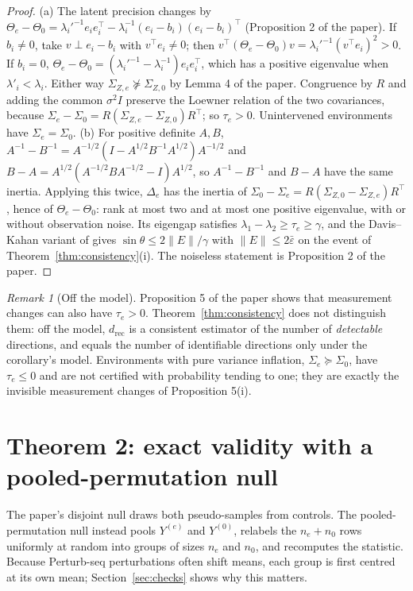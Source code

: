 \documentclass[11pt]{article}
\theoremstyle{remark}
\newtheorem{remark}{Remark}
\begin{document}
\begin{proof}
(a) The latent precision changes by $\Theta_e-\Theta_0=\lambda_i'^{-1}e_ie_i^\top-\lambda_i^{-1}(e_i-b_i)(e_i-b_i)^\top$ (Proposition 2 of the paper). If $b_i\ne0$, take $v\perp e_i-b_i$ with $v^\top e_i\ne0$; then $v^\top(\Theta_e-\Theta_0)v=\lambda_i'^{-1}(v^\top e_i)^2>0$. If $b_i=0$, $\Theta_e-\Theta_0=(\lambda_i'^{-1}-\lambda_i^{-1})e_ie_i^\top$, which has a positive eigenvalue when $\lambda'_i<\lambda_i$. Either way $\Sigma_{Z,e}\not\succeq\Sigma_{Z,0}$ by Lemma 4 of the paper. Congruence by $R$ and adding the common $\sigma^2I$ preserve the Loewner relation of the two covariances, because $\Sigma_e-\Sigma_0=R(\Sigma_{Z,e}-\Sigma_{Z,0})R^\top$; so $\tau_e>0$. Unintervened environments have $\Sigma_e=\Sigma_0$. (b) For positive definite $A,B$, $A^{-1}-B^{-1}=A^{-1/2}(I-A^{1/2}B^{-1}A^{1/2})A^{-1/2}$ and $B-A=A^{1/2}(A^{-1/2}BA^{-1/2}-I)A^{1/2}$, so $A^{-1}-B^{-1}$ and $B-A$ have the same inertia. Applying this twice, $\Delta_e$ has the inertia of $\Sigma_0-\Sigma_e=R(\Sigma_{Z,0}-\Sigma_{Z,e})R^\top$, hence of $\Theta_e-\Theta_0$: rank at most two and at most one positive eigenvalue, with or without observation noise. Its eigengap satisfies $\lambda_1-\lambda_2\ge\tau_e\ge\gamma$, and the Davis--Kahan variant of \citet{yu2015davis} gives $\sin\theta\le2\|E\|/\gamma$ with $\|E\|\le2\bar\varepsilon$ on the event of Theorem~\ref{thm:consistency}(i). The noiseless statement is Proposition 2 of the paper.
\end{proof}

\begin{remark}[Off the model]
\label{rem:inflation}
Proposition 5 of the paper shows that measurement changes can also have $\tau_e>0$. Theorem~\ref{thm:consistency} does not distinguish them: off the model, $d_{\mathrm{rec}}$ is a consistent estimator of the number of \emph{detectable} directions, and equals the number of identifiable directions only under the corollary's model. Environments with pure variance inflation, $\Sigma_e\succeq\Sigma_0$, have $\tau_e\le0$ and are not certified with probability tending to one; they are exactly the invisible measurement changes of Proposition 5(i).
\end{remark}

\section{Theorem 2: exact validity with a pooled-permutation null}

The paper's disjoint null draws both pseudo-samples from controls. The pooled-permutation null instead pools $Y^{(e)}$ and $Y^{(0)}$, relabels the $n_e+n_0$ rows uniformly at random into groups of sizes $n_e$ and $n_0$, and recomputes the statistic. Because Perturb-seq perturbations often shift means, each group is first centred at its own mean; Section~\ref{sec:checks} shows why this matters.
\end{document}
